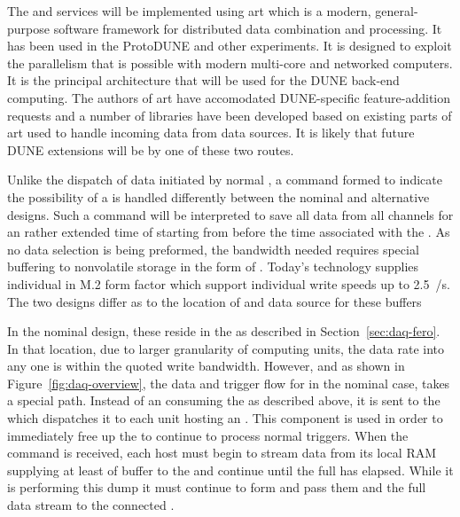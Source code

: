 The  and  services will be implemented using
art which is a modern, general-purpose software framework for
distributed data combination and processing. 
It has been used in the ProtoDUNE and other experiments.
It is designed to exploit the parallelism that is possible with
modern multi-core and networked computers. 
It is the principal architecture that will be used for the DUNE 
back-end computing.
The authors of art have accomodated DUNE-specific feature-addition
requests and a number of libraries have been developed based on
existing parts of art used to handle incoming data from data
sources. 
It is likely that future DUNE extensions will be by one of these two
routes.

Unlike the dispatch of data initiated by normal ,
a command formed to indicate the possibility of a  is
handled differently between the nominal and alternative designs. 
Such a command will be interpreted to save all data from all channels
for an rather extended time of \snbtime starting from \snbpretime
before the time associated with the . 
As no data selection is being preformed, the bandwidth needed requires
special buffering to nonvolatile storage in the form of . 
Today's technology supplies individual  in M.2 form factor
which support individual write speeds up to \SI{2.5}{\GB/\s}. 
The two designs differ as to the location of and data source for these
buffers

In the nominal design, these  reside in the 
as described in Section~\ref{sec:daq-fero}. 
In that location, due to larger granularity of computing units, the
data rate into any one  is within the quoted write
bandwidth. 
However, and as shown in Figure~\ref{fig:daq-overview}, the data and
trigger flow for  in the nominal case, takes a special
path. 
Instead of an  consuming the  as
described above, it is sent to the  which dispatches
it to each  unit hosting an . 
This component is used in order to immediately free up the 
to continue to process normal triggers.
When the command is received, each host must begin to stream data from
its local RAM supplying at least \snbpretime of buffer to the
 and continue until the full \snbtime has elapsed. 
While it is performing this dump it must continue to form
 and pass them and the full data stream to the
connected .

